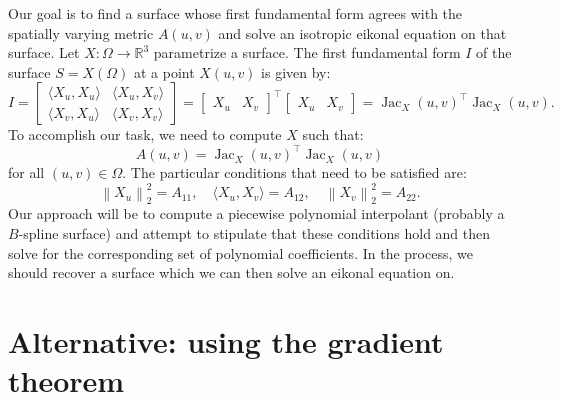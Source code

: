 \documentclass[12pt]{article}
\newcommand{\norm}[1]{\left\|#1\right\|}
\DeclareMathOperator{\Jac}{Jac}
\begin{document}
Our goal is to find a surface whose first fundamental form agrees with
the spatially varying metric $A(u, v)$ and solve an isotropic eikonal
equation on that surface. Let $X : \Omega \to \mathbb{R}^3$
parametrize a surface. The first fundamental form $I$ of the surface
$S = X(\Omega)$ at a point $X(u, v)$ is given by:
\begin{equation}
  I = \begin{bmatrix}
    \langle X_u, X_u \rangle & \langle X_u, X_v \rangle \\
    \langle X_v, X_u \rangle & \langle X_v, X_v \rangle
  \end{bmatrix} = \begin{bmatrix}
    X_u & X_v
  \end{bmatrix}^\top \begin{bmatrix}
    X_u & X_v
  \end{bmatrix} = \Jac_X(u, v)^\top \Jac_X(u, v).
\end{equation}
To accomplish our task, we need to compute $X$ such that:
\begin{equation}
  A(u, v) = \Jac_X(u, v)^\top \Jac_X(u, v)
\end{equation}
for all $(u, v) \in \Omega$. The particular conditions that need to be
satisfied are:
\begin{equation}
  \norm{X_u}_2^2 = A_{11}, \hspace{1em} \langle X_u, X_v \rangle = A_{12}, \hspace{1em} \norm{X_v}_2^2 = A_{22}.
\end{equation}
Our approach will be to compute a piecewise polynomial interpolant
(probably a $B$-spline surface) and attempt to stipulate that these
conditions hold and then solve for the corresponding set of polynomial
coefficients. In the process, we should recover a surface which we can
then solve an eikonal equation on.

\section{Alternative: using the gradient theorem}
\end{document}
